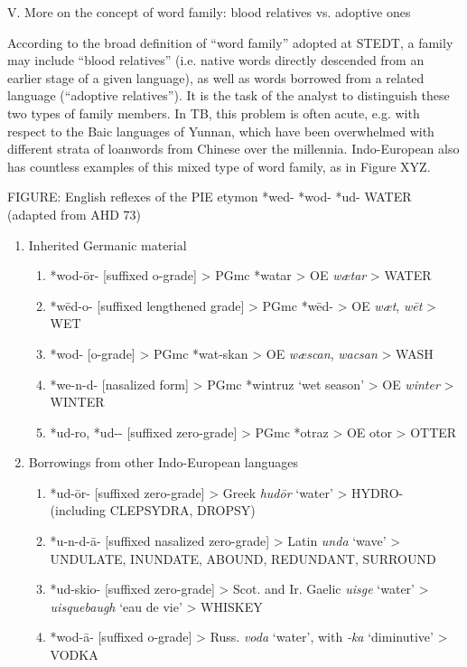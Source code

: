 V. More on the concept of word family: blood relatives vs. adoptive ones

According to the broad definition of “word family” adopted at STEDT, a family may include “blood relatives” (i.e. native words directly descended from an earlier stage of a given language), as well as words borrowed from a related language (“adoptive relatives”). It is the task of the analyst to distinguish these two types of family members. In TB, this problem is often acute, e.g. with respect to the Baic languages of Yunnan, which have been overwhelmed with different strata of loanwords from Chinese over the millennia.  Indo-European also has countless examples of this mixed type of word family, as in Figure XYZ.

	FIGURE: English reflexes of the PIE etymon  *wed-  *wod-  *ud- WATER (adapted from AHD 73)

\begin{enumerate}
\item Inherited Germanic material
\begin{enumerate}
\item  *wod-\=or-	[suffixed o-grade]
	> PGmc *watar > OE {\it w{\ae}tar} > WATER
\item *w\={e}d-o-	[suffixed lengthened grade]
  > PGmc *w\=ed- > OE {\it w{\ae}t}, {\it w\=et} > WET
\item *wod-	[o-grade]
	> PGmc *wat-skan > OE {\it w{\ae}scan}, {\it wacsan} > WASH
\item *we-n-d-	[nasalized form]
	> PGmc *wintruz ‘wet season’ > OE {\it winter} > WINTER
\item *ud-ro, *ud--  [suffixed zero-grade]
	> PGmc *otraz > OE otor > OTTER
\end{enumerate}

\item Borrowings from other Indo-European languages
\begin{enumerate}
\item *ud-\=or-	[suffixed zero-grade]
	> Greek {\it hud\=or} ‘water’ > HYDRO- (including CLEPSYDRA, DROPSY)
\item *u-n-d-\={a}-	[suffixed nasalized zero-grade]
	> Latin {\it unda} ‘wave’ > UNDULATE, INUNDATE, ABOUND, REDUNDANT, SURROUND
\item *ud-skio-	[suffixed zero-grade]
	> Scot. and Ir. Gaelic {\it uisge} ‘water’ > {\it uisquebaugh} ‘eau de vie’ > WHISKEY
\item *wod-\={a}-	[suffixed o-grade]
	> Russ. {\it voda} ‘water’, with {\it -ka} ‘diminutive’ > VODKA
\end{enumerate}
\end{enumerate}
	
